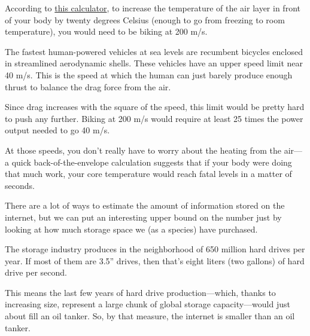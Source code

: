 {According to \href{http://www.grc.nasa.gov/WWW/BGH/stagtmp.html}{this calculator}, to increase the temperature of the air layer in front of your body by twenty degrees Celsius (enough to go from freezing to room temperature), you would need to be biking at 200 m/s.}

{The fastest human-powered vehicles at sea levels are recumbent bicycles enclosed in streamlined aerodynamic shells. These vehicles have an upper speed limit near 40 m/s. This is the speed at which the human can just barely produce enough thrust to balance the drag force from the air.}

{Since drag increases with the square of the speed, this limit would be pretty hard to push any further. Biking at 200 m/s would require at least 25 times the power output needed to go 40 m/s.}

{At those speeds, you don’t really have to worry about the heating from the air—a quick back-of-the-envelope calculation suggests that if your body were doing that much work, your core temperature would reach fatal levels in a matter of seconds.}


\hfill{}

{There are a lot of ways to estimate the amount of information stored on the internet, but we can put an interesting upper bound on the number just by looking at how much storage space we (as a species) have purchased.}

{The storage industry produces in the neighborhood of 650 million hard drives per year. If most of them are 3.5” drives, then that’s eight liters (two gallons) of hard drive per second.}

{This means the last few years of hard drive production—which, thanks to increasing size, represent a large chunk of global storage capacity—would just about fill an oil tanker. So, by that measure, the internet is smaller than an oil tanker.}


\hfill{}

